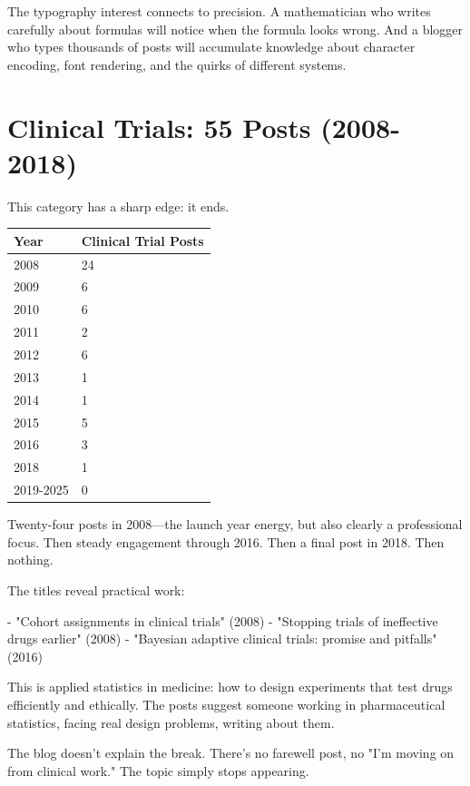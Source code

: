 The typography interest connects to precision. A mathematician who writes carefully about formulas will notice when the formula looks wrong. And a blogger who types thousands of posts will accumulate knowledge about character encoding, font rendering, and the quirks of different systems.

\bigskip

\section*{Clinical Trials: 55 Posts (2008-2018)}

This category has a sharp edge: it ends.

\begin{center}
\begin{tabular}{ll}
\toprule
\textbf{Year} & \textbf{Clinical Trial Posts} \\
\midrule
2008 & 24 \\
2009 & 6 \\
2010 & 6 \\
2011 & 2 \\
2012 & 6 \\
2013 & 1 \\
2014 & 1 \\
2015 & 5 \\
2016 & 3 \\
2018 & 1 \\
2019-2025 & 0 \\
\bottomrule
\end{tabular}
\end{center}

Twenty-four posts in 2008—the launch year energy, but also clearly a professional focus. Then steady engagement through 2016. Then a final post in 2018. Then nothing.

The titles reveal practical work:

- "Cohort assignments in clinical trials" (2008)
- "Stopping trials of ineffective drugs earlier" (2008)
- "Bayesian adaptive clinical trials: promise and pitfalls" (2016)

This is applied statistics in medicine: how to design experiments that test drugs efficiently and ethically. The posts suggest someone working in pharmaceutical statistics, facing real design problems, writing about them.

The blog doesn't explain the break. There's no farewell post, no "I'm moving on from clinical work." The topic simply stops appearing.

